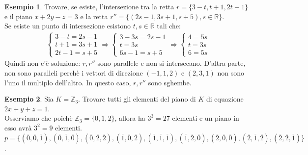 \documentclass[a4paper]{article}
\theoremstyle{definition}
\newtheorem*{es}{Esempio}
\begin{document}
	\begin{es}
		Trovare, se esiste, l'intersezione tra la retta $r = \{3 - t, t + 1, 2t - 1\}$ e il piano $x + 2y - z = 3$ e la retta
		$r'' = \{(2s - 1, 3s + 1, s + 5), s \in \mathbb{R}\}$. \\
		Se esiste un punto di intersezione esistono $t, s \in \mathbb{R}$ tali che:
		\begin{align*}
			\begin{cases}
				3 - t = 2s - 1 \\
				t + 1 = 3s + 1 \\
				2t - 1 = s + 5
			\end{cases} \Rightarrow \begin{cases}
				3 - 3s = 2s - 1 \\
				t = 3s \\
				6s - 1 = s + 5
			\end{cases} \Rightarrow \begin{cases}
				4 = 5s \\
				t = 3s \\
				6 = 5s
			\end{cases}
		\end{align*}
		Quindi non c'è soluzione: $r, r''$ sono parallele e non si intersecano.
		D'altra parte, non sono paralleli perchè i vettori di direzione $(-1, 1, 2)$ e $(2, 3, 1)$ non sono l'uno il multiplo dell'altro.
		In questo caso, $r, r''$ sono sghembe.
	\end{es}

	\begin{es}
		Sia $K = \mathbb{Z}_3$. Trovare tutti gli elementi del piano di $K$ di equazione $2x + y + z = 1$. \\
		Osserviamo che poichè $\mathbb{Z}_3 = \{\overline{0}, \overline{1}, \overline{2}\}$, allora ha $3^3 = 27$ elementi e un piano in esso avrà $3^2 = 9$ elementi.
		$p = \{(\overline{0}, \overline{0}, \overline{1}), (\overline{0}, \overline{1}, \overline{0}), (\overline{0}, \overline{2}, \overline{2}),
		(\overline{1}, \overline{0}, \overline{2}), (\overline{1}, \overline{1}, \overline{1}), (\overline{1}, \overline{2}, \overline{0}),
		(\overline{2}, \overline{0}, \overline{0}), (\overline{2}, \overline{1}, \overline{2}), (\overline{2}, \overline{2}, \overline{1})\}$.
	\end{es}
\end{document}
